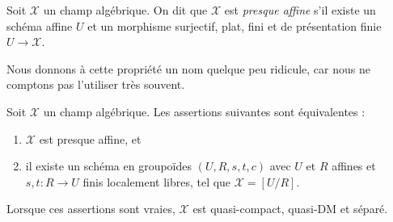 \begin{definition}
\label{definition-well-nigh-affine}
Soit $\mathcal{X}$ un champ algébrique. On dit que $\mathcal{X}$
est {\it presque affine} s'il existe un schéma affine $U$
et un morphisme surjectif, plat, fini et de présentation finie
$U \to \mathcal{X}$.
\end{definition}

\noindent
Nous donnons à cette propriété un nom quelque peu ridicule, car nous ne comptons pas
l'utiliser très souvent.

\begin{lemma}
\label{lemma-well-nigh-affine}
Soit $\mathcal{X}$ un champ algébrique. Les assertions suivantes sont équivalentes :
\begin{enumerate}
\item $\mathcal{X}$ est presque affine, et
\item il existe un schéma en groupoïdes $(U, R, s, t, c)$ avec $U$ et
$R$ affines et $s, t : R \to U$ finis localement libres, tel que
$\mathcal{X} = [U/R]$.
\end{enumerate}
Lorsque ces assertions sont vraies, $\mathcal{X}$ est quasi-compact, quasi-DM et séparé.
\end{lemma}

